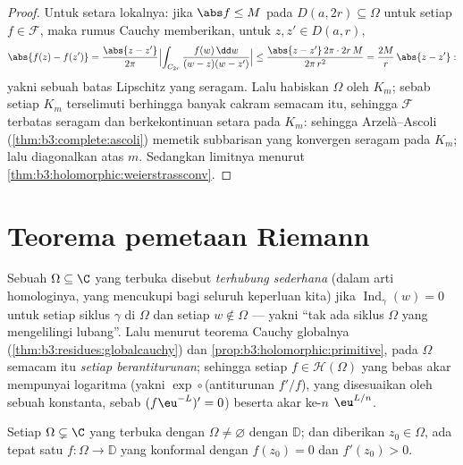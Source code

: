 \begin{proof}
Untuk  setara lokalnya: jika $\abs f \leq M$ pada $D(a, 2r)
\subseteq \Omega$ untuk setiap $f \in \mathcal F$, maka rumus
Cauchy memberikan, untuk $z, z' \in D(a, r)$,
\[
\abs{f(z) - f(z')} = \frac{\abs{z - z'}}{2\pi}
\Bigl|\int_{C_{2r}}\frac{f(w)\,\dd w}{(w-z)(w-z')}\Bigr|
\leq \frac{\abs{z - z'}\,2\pi\cdot2r\,M}{2\pi\,r^2}
= \frac{2M}{r}\,\abs{z - z'} :
\]
yakni sebuah batas Lipschitz yang seragam. Lalu habiskan $\Omega$ oleh  $K_m$;
sebab setiap $K_m$ terselimuti berhingga banyak cakram semacam itu, sehingga
$\mathcal F$ terbatas seragam dan berkekontinuan setara pada
$K_m$: sehingga Arzelà--Ascoli (\cref{thm:b3:complete:ascoli})
memetik subbarisan yang konvergen seragam pada $K_m$;
lalu diagonalkan atas $m$. Sedangkan limitnya  menurut
\cref{thm:b3:holomorphic:weierstrassconv}.
\end{proof}

\section{Teorema pemetaan Riemann}

\begin{definition}\label{def:b3:conformal:simplyconnected}
Sebuah $\Omega \subseteq \C$ yang terbuka  disebut \emph{terhubung
sederhana} (dalam arti homologinya,
yang mencukupi bagi seluruh keperluan kita) jika
$\operatorname{Ind}_\gamma(w) = 0$ untuk setiap siklus $\gamma$ di
$\Omega$ dan setiap $w \notin \Omega$ --- yakni ``tak ada siklus
$\Omega$ yang mengelilingi lubang''. Lalu menurut teorema Cauchy globalnya
(\cref{thm:b3:residues:globalcauchy}) dan
\cref{prop:b3:holomorphic:primitive}, pada $\Omega$ semacam itu
\emph{setiap  berantiturunan}; sehingga setiap
$f \in \mathcal H(\Omega)$ yang bebas akar mempunyai logaritma
 (yakni $\exp\circ$(antiturunan $f'/f$), yang disesuaikan oleh sebuah
konstanta, sebab $(f\eu^{-L})' = 0$) beserta akar ke-$n$ 
$\eu^{L/n}$.
\end{definition}

\begin{theorem}
\label{thm:b3:conformal:rmt}
Setiap $\Omega \subsetneq \C$ yang terbuka  dengan $\Omega
\neq \varnothing$  dengan $\mathbb D$;
dan diberikan $z_0 \in \Omega$, ada tepat satu $f \colon
\Omega \to \mathbb D$ yang konformal dengan $f(z_0) = 0$ dan $f'(z_0) >
0$.
\end{theorem}

